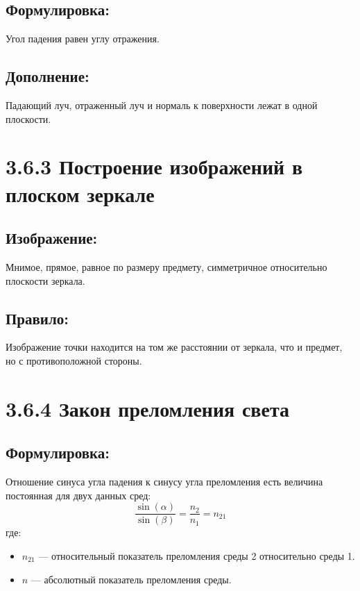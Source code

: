 \documentclass[a4paper,12pt]{article}
\begin{document}
\subsection*{Формулировка:}
\vspace{-3pt}
Угол падения равен углу отражения.

\vspace{-9pt}
\subsection*{Дополнение:}
\vspace{-3pt}
Падающий луч, отраженный луч и нормаль к поверхности лежат в одной плоскости.


\section*{3.6.3 Построение изображений в плоском зеркале}
\vspace{-9pt}
\subsection*{Изображение:}
\vspace{-3pt}
Мнимое, прямое, равное по размеру предмету, симметричное относительно плоскости зеркала.

\vspace{-9pt}
\subsection*{Правило:}
\vspace{-3pt}
Изображение точки находится на том же расстоянии от зеркала, что и предмет, но с противоположной стороны.


\section*{3.6.4 Закон преломления света}
\vspace{-9pt}
\subsection*{Формулировка:}
\vspace{-3pt}
Отношение синуса угла падения к синусу угла преломления есть величина постоянная для двух данных сред:
\vspace{-0.05em}
$$ \frac{\sin(\alpha)}{\sin(\beta)} = \frac{n_2}{n_1} = n_{21} $$
где:
\begin{itemize}
    \item $n_{21}$ — относительный показатель преломления среды 2 относительно среды 1.
    \item $n$ — абсолютный показатель преломления среды.
\end{itemize}
\end{document}
